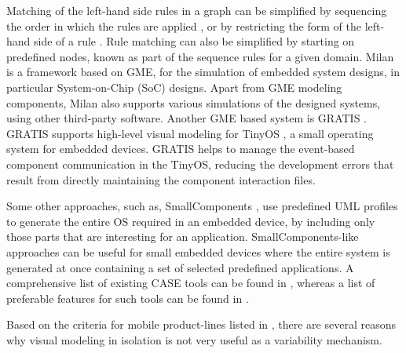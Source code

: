 Matching of the left-hand side rules in a graph can be simplified by sequencing the order in which the rules are applied \cite{gme.graphs}, or by restricting the form of the left-hand side of a rule \cite{Rekers-Schuerr02:97}. Rule matching can also be simplified by starting on predefined nodes, known as part of the sequence rules for a given domain. Milan \cite{gme.milan} is a framework based on GME, for the simulation of embedded system designs, in particular System-on-Chip (SoC) designs. Apart from GME modeling components, Milan also supports various simulations of the designed systems, using other third-party software. Another GME based system is GRATIS \cite{gme.gratis}. GRATIS supports high-level visual modeling for TinyOS \cite{gme.tinyos}, a small operating system for embedded devices. GRATIS helps to manage the event-based component communication in the TinyOS, reducing the development errors that result from directly maintaining the component interaction files.

Some other approaches, such as, SmallComponents \cite{www.smallcomps}, use predefined UML profiles to generate the entire OS required in an embedded device, by including only those parts that are interesting for an application. Small\-Components-like approaches can be useful for small embedded devices where the entire system is generated at once containing a set of selected predefined applications. A comprehensive list of existing CASE tools can be found in \cite{case.tools}, whereas a list of preferable features for such tools can be found in \cite{uml.tools.criteria}.

Based on the criteria for mobile product-lines listed in , there are several reasons why visual modeling in isolation is not very useful as a variability mechanism.

